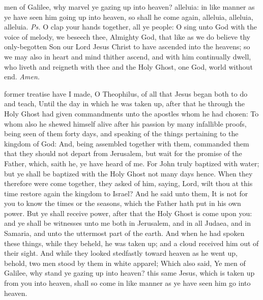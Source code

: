 
\introit
{} men of Galilee, why marvel ye gazing up into heaven? alleluia: in like manner as ye have seen him going up into heaven, so shall he come again, alleluia, alleluia, alleluia. \textit{Ps.} O clap your hands together, all ye people: O sing unto God with the voice of melody,
\collect
{} we beseech thee, Almighty God, that like as we do believe thy only-begotten Son our Lord Jesus Christ to have ascended into the heavens; so we may also in heart and mind thither ascend, and with him continually dwell, who liveth and reigneth with thee and the Holy Ghost, one God, world without end. \textit{Amen.}

 former treatise have I made, O Theophilus, of all that Jesus began both to do and teach, Until the day in which he was taken up, after that he through the Holy Ghost had given commandments unto the apostles whom he had chosen: To whom also he shewed himself alive after his passion by many infallible proofs, being seen of them forty days, and speaking of the things pertaining to the kingdom of God: And, being assembled together with them, commanded them that they should not depart from Jerusalem, but wait for the promise of the Father, which, saith he, ye have heard of me. For John truly baptized with water; but ye shall be baptized with the Holy Ghost not many days hence. When they therefore were come together, they asked of him, saying, Lord, wilt thou at this time restore again the kingdom to Israel? And he said unto them, It is not for you to know the times or the seasons, which the Father hath put in his own power. But ye shall receive power, after that the Holy Ghost is come upon you: and ye shall be witnesses unto me both in Jerusalem, and in all Judaea, and in Samaria, and unto the uttermost part of the earth. And when he had spoken these things, while they beheld, he was taken up; and a cloud received him out of their sight. And while they looked stedfastly toward heaven as he went up, behold, two men stood by them in white apparel; Which also said, Ye men of Galilee, why stand ye gazing up into heaven? this same Jesus, which is taken up from you into heaven, shall so come in like manner as ye have seen him go into heaven.

